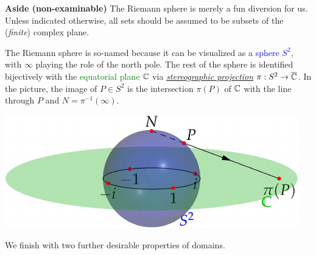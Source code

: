 \begin{aside}{\bf Aside (non-examinable)}{}
	The Riemann sphere is merely a fun diversion for us. Unless indicated otherwise, all sets should be assumed to be subsets of the (\emph{finite}) complex plane.\par
	\begin{minipage}[t]{0.49\linewidth}\vspace{-5pt}
		The Riemann sphere is so-named because it can be visualized as a \textcolor{blue}{sphere $S^2$}, with $\infty$ playing the role of the north pole. The rest of the sphere is identified bijectively with the \textcolor{Green}{equatorial plane $\mathbb{C}$} via \href{https://en.wikipedia.org/wiki/Stereographic_projection}{\emph{stereographic projection}} $\pi:S^2\to\overline{\mathbb{C}}$. In the picture, the image of $P\in S^2$ is the intersection $\pi(P)$ of $\mathbb{C}$ with the line through $P$ and $N=\pi^{-1}(\infty)$.
	\end{minipage}
	\hfill
	\begin{minipage}[t]{0.5\linewidth}\vspace{0pt}
		\flushright%
		\href{https://www.math.uci.edu/~ndonalds/math147/complex-stereo.html}{\includegraphics{complex-stereo}}
	\end{minipage}
\end{aside}

 

We finish with two further desirable properties of domains.

